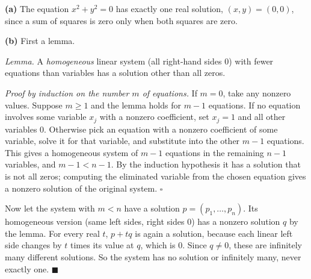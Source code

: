 \textbf{(a)} The equation $x^2+y^2=0$ has exactly one real solution, $(x,y)=(0,0)$, since a sum of squares is zero only when both squares are zero.

\textbf{(b)} First a lemma.

\emph{Lemma.} A \emph{homogeneous} linear system (all right-hand sides $0$) with fewer equations than variables has a solution other than all zeros.

\emph{Proof by induction on the number $m$ of equations.} If $m=0$, take any nonzero values. Suppose $m\ge1$ and the lemma holds for $m-1$ equations. If no equation involves some variable $x_j$ with a nonzero coefficient, set $x_j=1$ and all other variables $0$. Otherwise pick an equation with a nonzero coefficient of some variable, solve it for that variable, and substitute into the other $m-1$ equations. This gives a homogeneous system of $m-1$ equations in the remaining $n-1$ variables, and $m-1<n-1$. By the induction hypothesis it has a solution that is not all zeros; computing the eliminated variable from the chosen equation gives a nonzero solution of the original system. $\square$

Now let the system with $m<n$ have a solution $p=(p_1,\dots,p_n)$. Its homogeneous version (same left sides, right sides $0$) has a nonzero solution $q$ by the lemma. For every real $t$, $p+tq$ is again a solution, because each linear left side changes by $t$ times its value at $q$, which is $0$. Since $q\ne0$, these are infinitely many different solutions. So the system has no solution or infinitely many, never exactly one. $\blacksquare$
